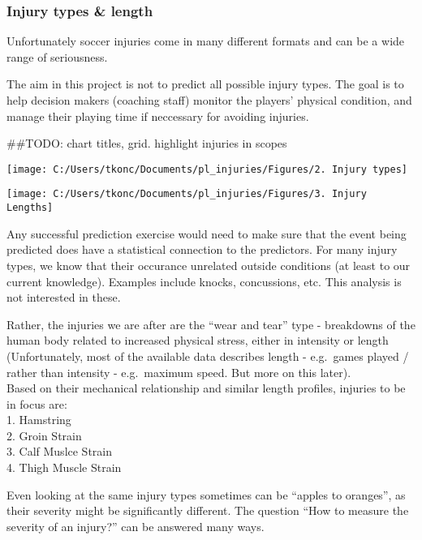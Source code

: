 \documentclass[]{article}
\begin{document}
\subsubsection{Injury types \& length}\label{injury-types-length}

Unfortunately soccer injuries come in many different formats and can be
a wide range of seriousness.

The aim in this project is not to predict all possible injury types. The
goal is to help decision makers (coaching staff) monitor the players'
physical condition, and manage their playing time if neccessary for
avoiding injuries.

{\#\#TODO: chart titles, grid. highlight injuries in scopes}

\begin{center}\texttt{[image: C:/Users/tkonc/Documents/pl\_injuries/Figures/2. Injury types]} \end{center}

\begin{center}\texttt{[image: C:/Users/tkonc/Documents/pl\_injuries/Figures/3. Injury Lengths]} \end{center}

Any successful prediction exercise would need to make sure that the
event being predicted does have a statistical connection to the
predictors. For many injury types, we know that their occurance
unrelated outside conditions (at least to our current knowledge).
Examples include knocks, concussions, etc. This analysis is not
interested in these.

Rather, the injuries we are after are the ``wear and tear'' type -
breakdowns of the human body related to increased physical stress,
either in intensity or length (Unfortunately, most of the available data
describes length - e.g.~games played / rather than intensity -
e.g.~maximum speed. But more on this later).\\
Based on their mechanical relationship and similar length profiles,
injuries to be in focus are:\\
1. Hamstring\\
2. Groin Strain\\
3. Calf Muslce Strain\\
4. Thigh Muscle Strain

Even looking at the same injury types sometimes can be ``apples to
oranges'', as their severity might be significantly different. The
question ``How to measure the severity of an injury?'' can be answered
many ways.
\end{document}
